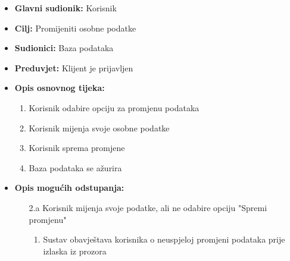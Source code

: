                         \noindent {}
					\begin{itemize}
	
						\item \textbf{Glavni sudionik: }Korisnik
						\item  \textbf{Cilj:} Promijeniti osobne podatke
						\item  \textbf{Sudionici:} Baza podataka
						\item  \textbf{Preduvjet:} Klijent je prijavljen
						\item  \textbf{Opis osnovnog tijeka:}
						
						\item[] \begin{enumerate}
							\item Korisnik odabire opciju za promjenu podataka
                                \item Korisnik mijenja svoje osobne podatke
                                \item Korisnik sprema promjene
                                \item Baza podataka se ažurira
						\end{enumerate}

                            \item  \textbf{Opis mogućih odstupanja:}
						
						\item[] \begin{enumerate}
	
							\item[2.a] Korisnik mijenja svoje podatke, ali ne odabire opciju "Spremi promjenu"
							\item[] \begin{enumerate}
								
								\item Sustav obavještava korisnika o neuspjeloj promjeni podataka prije izlaska iz prozora\\
								
							\end{enumerate}
			
							
						\end{enumerate}
						
					\end{itemize}


